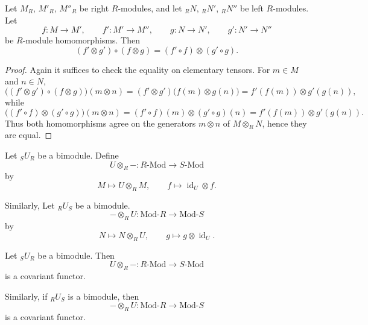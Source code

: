 \begin{lemma}
    Let $M_R$, $M'_R$, $M''_R$ be right $R$-modules, and let ${}_R N$, ${}_R N'$, ${}_R N''$ be left $R$-modules. Let
    \[
        f:M\to M',\qquad f':M'\to M'',
        \qquad
        g:N\to N',\qquad g':N'\to N''
    \]
    be $R$-module homomorphisms. Then
    \[
        (f'\otimes g')\circ (f\otimes g)=(f'\circ f)\otimes (g'\circ g).
    \]
\end{lemma}

\begin{proof}
    Again it suffices to check the equality on elementary tensors. For $m\in M$ and $n\in N$,
    \[
        \bigl((f'\otimes g')\circ (f\otimes g)\bigr)(m\otimes n)
        =(f'\otimes g')\bigl(f(m)\otimes g(n)\bigr)
        =f'(f(m))\otimes g'(g(n)),
    \]
    while
    \[
        \bigl((f'\circ f)\otimes (g'\circ g)\bigr)(m\otimes n)
        =(f'\circ f)(m)\otimes (g'\circ g)(n)
        =f'(f(m))\otimes g'(g(n)).
    \]
    Thus both homomorphisms agree on the generators $m\otimes n$ of $M\otimes_R N$, hence they are equal.
\end{proof}

\begin{definition}
    Let ${}_S U_R$ be a bimodule.
    Define
    \[
        U \otimes_R - : R\text{-}\mathrm{Mod} \longrightarrow S\text{-}\mathrm{Mod}
    \]
    by
    \[
        M \longmapsto U \otimes_R M,
        \qquad
        f \longmapsto \operatorname{id}_U \otimes f.
    \]
\end{definition}

Similarly, Let ${}_R U_S$ be a bimodule.
\[
    - \otimes_R U : \mathrm{Mod}\text{-}R \longrightarrow \mathrm{Mod}\text{-}S
\]
by
\[
    N \longmapsto N \otimes_R U,
    \qquad
    g \longmapsto g \otimes \operatorname{id}_U.
\]

\begin{proposition}
    Let ${}_S U_R$ be a bimodule. Then
    \[
        U \otimes_R - : R\text{-}\mathrm{Mod} \longrightarrow S\text{-}\mathrm{Mod}
    \]
    is a covariant functor.

    Similarly, if ${}_R U_S$ is a bimodule, then
    \[
        - \otimes_R U : \mathrm{Mod}\text{-}R \longrightarrow \mathrm{Mod}\text{-}S
    \]
    is a covariant functor.
\end{proposition}

